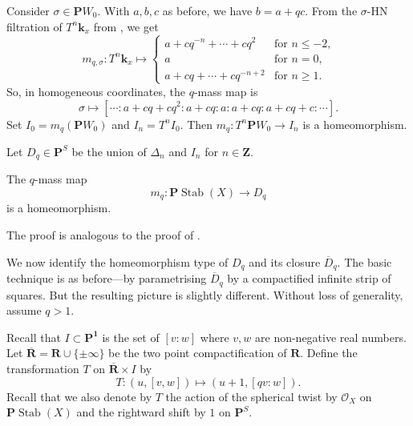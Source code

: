 \documentclass{amsart}
\begin{document}
Consider \(\sigma \in \mathbf{P}W_0\).
With \(a,b,c\) as before, we have \(b = a + qc\).
From the \(\sigma\)-HN filtration of \(T^n\mathbf{k}_x\) from , we get
\[ m_{q, \sigma} \colon T^n \mathbf{k}_x \mapsto
  \begin{cases}
    a + cq^{-n}+ \cdots + c q^{2} &\text{for \(n \leq -2\),}\\
    a &\text{for \(n = 0\),}\\
    a + cq + \cdots + c q^{-n+2} & \text{for \(n \geq 1\)}.
  \end{cases}
\]
So, in homogeneous coordinates, the \(q\)-mass map is
\[ \sigma \mapsto [ \cdots :a + cq+cq^2 : a + cq :a: a+cq: a + cq + c: \cdots ].\]
Set \(I_{0} = m_q(\mathbf{P}W_0)\) and \(I_n = T^nI_0\).
Then \(m_q \colon T^n \mathbf{P}W_0 \to I_n\) is a homeomorphism.

Let \(D_q \in \mathbf{P}^S\) be the union of \(\Delta_n\) and \(I_n\) for \(n \in \mathbf{Z}\).
\begin{theorem}\label{thm:q-homeo}
  The \(q\)-mass map
  \[ m_q \colon \mathbf{P} \operatorname{Stab}(X) \to D_q\]
  is a homeomorphism.
\end{theorem}
The proof is analogous to the proof of .

We now identify the homeomorphism type of \(D_q\) and its closure \(\overline D_q\).
The basic technique is as before---by parametrising \(\overline D_q\) by a compactified infinite strip of squares.
But the resulting picture is slightly different.
Without loss of generality, assume \(q > 1\).

Recall that \(I  \subset \mathbf{P^1}\) is the set of \([v:w]\) where \(v, w\) are non-negative real numbers.
Let \(\overline {\mathbf{R}} = \mathbf{R} \cup \{\pm \infty\}\) be the two point compactification of \(\mathbf{R}\).
Define the transformation \(T\) on \(\overline{\mathbf{R}} \times I\) by
\[ T \colon (u,[v,w]) \mapsto (u+1,[qv:w]).\]
Recall that we also denote by \(T\) the action of the spherical twist by \(\mathcal{O}_X\) on \(\mathbf{P} \operatorname{Stab}(X)\) and the rightward shift by \(1\) on \(\mathbf{P}^S\).
\end{document}
